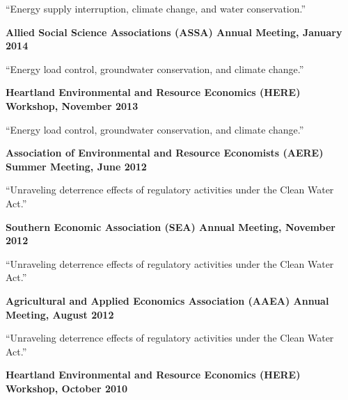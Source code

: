 \documentclass[10pt,margin,line]{res}
\newenvironment{list1}{
  \begin{list}{\ding{113}}{%
      \setlength{\itemsep}{0in}
      \setlength{\parsep}{0in} \setlength{\parskip}{0in}
      \setlength{\topsep}{0in} \setlength{\partopsep}{0in}
      \setlength{\leftmargin}{0.17in}}}{\end{list}}
\newenvironment{list2}{
  \begin{list}{-}{%
      \setlength{\itemsep}{0in}
      \setlength{\parsep}{0in} \setlength{\parskip}{0in}
      \setlength{\topsep}{0in} \setlength{\partopsep}{0in}
      \setlength{\leftmargin}{0.2in}}}{\end{list}}
\begin{document}
\begin{resume}
\begin{list1}
  \begin{list2}
  \item  ``Energy supply interruption, climate change, and water conservation.''
  \end{list2}
\vspace*{0.3cm}
\item[] \textbf{Allied Social Science Associations (ASSA) Annual Meeting, January 2014}
  \begin{list2}
  \item ``Energy load control, groundwater conservation, and climate change.''
  \end{list2}
\vspace*{0.3cm}
\item[] \textbf{Heartland Environmental and Resource Economics (HERE) Workshop, November 2013}
  \begin{list2}
  \item ``Energy load control, groundwater conservation, and climate change.''
  \end{list2}
\vspace*{0.3cm}
\item[] \textbf{Association of Environmental and Resource Economists (AERE) Summer Meeting, June 2012}
  \begin{list2}
  \item ``Unraveling deterrence effects of regulatory activities under the Clean Water Act.''
  \end{list2}
\vspace*{0.3cm}
\item[] \textbf{Southern Economic Association (SEA) Annual Meeting, November 2012}
  \begin{list2}
  \item ``Unraveling deterrence effects of regulatory activities under the Clean Water Act.''
  \end{list2}
\vspace*{0.3cm}
\item[] \textbf{Agricultural and Applied Economics Association (AAEA) Annual Meeting, August 2012}
  \begin{list2}
  \item ``Unraveling deterrence effects of regulatory activities under the Clean Water Act.''
  \end{list2}
\vspace*{0.3cm}
\item[] \textbf{Heartland Environmental and Resource Economics (HERE) Workshop, October 2010}
  \begin{list2}

\end{list2}
\end{list1}
\end{resume}
\end{document}
